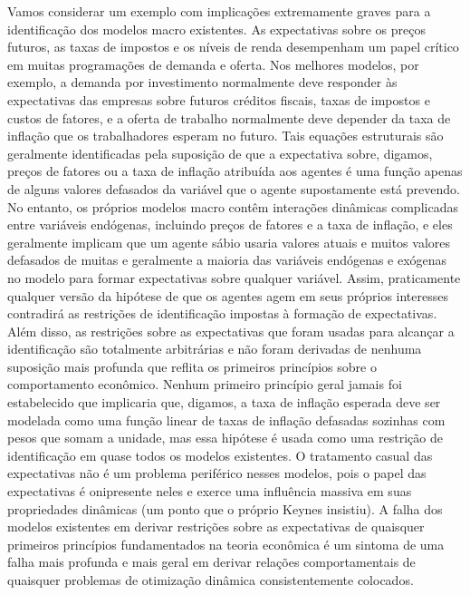 \documentclass[a4paper,12pt]{article}[abntex2]
\begin{document}
Vamos considerar um exemplo com implicações extremamente graves para a identificação dos modelos macro existentes. As expectativas sobre os preços futuros, as taxas de impostos e os níveis de renda desempenham um papel crítico em muitas programações de demanda e oferta. Nos melhores modelos, por exemplo, a demanda por investimento normalmente deve responder às expectativas das empresas sobre futuros créditos fiscais, taxas de impostos e custos de fatores, e a oferta de trabalho normalmente deve depender da taxa de inflação que os trabalhadores esperam no futuro. Tais equações estruturais são geralmente identificadas pela suposição de que a expectativa sobre, digamos, preços de fatores ou a taxa de inflação atribuída aos agentes é uma função apenas de alguns valores defasados da variável que o agente supostamente está prevendo. No entanto, os próprios modelos macro contêm interações dinâmicas complicadas entre variáveis endógenas, incluindo preços de fatores e a taxa de inflação, e eles geralmente implicam que um agente sábio usaria valores atuais e muitos valores defasados de muitas e geralmente a maioria das variáveis endógenas e exógenas no modelo para formar expectativas sobre qualquer variável. Assim, praticamente qualquer versão da hipótese de que os agentes agem em seus próprios interesses contradirá as restrições de identificação impostas à formação de expectativas. Além disso, as restrições sobre as expectativas que foram usadas para alcançar a identificação são totalmente arbitrárias e não foram derivadas de nenhuma suposição mais profunda que reflita os primeiros princípios sobre o comportamento econômico. Nenhum primeiro princípio geral jamais foi estabelecido que implicaria que, digamos, a taxa de inflação esperada deve ser modelada como uma função linear de taxas de inflação defasadas sozinhas com pesos que somam a unidade, mas essa hipótese é usada como uma restrição de identificação em quase todos os modelos existentes. O tratamento casual das expectativas não é um problema periférico nesses modelos, pois o papel das expectativas é onipresente neles e exerce uma influência massiva em suas propriedades dinâmicas (um ponto que o próprio Keynes insistiu). A falha dos modelos existentes em derivar restrições sobre as expectativas de quaisquer primeiros princípios fundamentados na teoria econômica é um sintoma de uma falha mais profunda e mais geral em derivar relações comportamentais de quaisquer problemas de otimização dinâmica consistentemente colocados.
\end{document}

